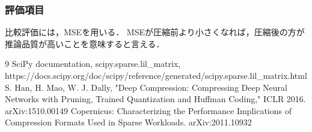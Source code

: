 \documentclass[a4paper,11pt,uplatex,dvipdfmx]{jsarticle}
\begin{document}
\subsubsection{評価項目}

比較評価には，MSEを用いる．
MSEが圧縮前より小さくなれば，圧縮後の方が推論品質が高いことを意味すると言える．

\begin{thebibliography}{9}
 SciPy documentation, scipy.sparse.lil_matrix, https://docs.scipy.org/doc/scipy/reference/generated/scipy.sparse.lil\_matrix.html
 S. Han, H. Mao, W. J. Dally, "Deep Compression: Compressing Deep Neural Networks with Pruning, Trained Quantization and Huffman Coding," ICLR 2016. arXiv:1510.00149
 Copernicus: Characterizing the Performance Implications of Compression Formats Used in Sparse Workloads. arXiv:2011.10932
\end{thebibliography}
\end{document}
